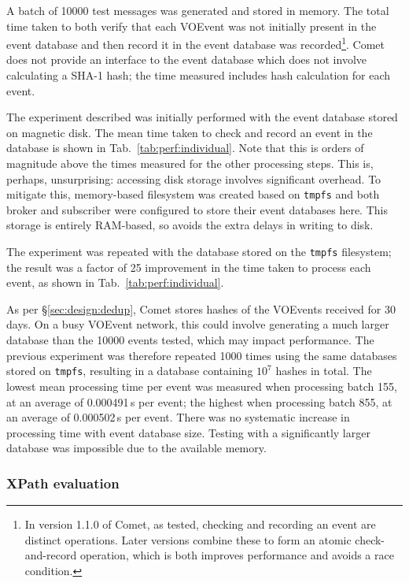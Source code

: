 \documentclass[5p,authoryear]{elsarticle}
\begin{document}
A batch of 10000 test messages was generated and stored in memory. The total
time taken to both verify that each VOEvent was not initially present in the
event database and then record it in the event database was
recorded\footnote{In version 1.1.0 of Comet, as tested, checking and recording
an event are distinct operations. Later versions combine these to form an
atomic check-and-record operation, which is both improves performance and
avoids a race condition.}. Comet does not provide an interface to the event
database which does not involve calculating a SHA-1 hash; the time measured
includes hash calculation for each event.

The experiment described was initially performed with the event database
stored on magnetic disk. The mean time taken to check and record an event in
the database is shown in Tab.~\ref{tab:perf:individual}. Note that this is
orders of magnitude above the times measured for the other processing steps.
This is, perhaps, unsurprising: accessing disk storage involves significant
overhead. To mitigate this, memory-based filesystem was created based on
\texttt{tmpfs} \citep{Kerrisk:2014} and both broker and subscriber were
configured to store their event databases here. This storage is entirely
RAM-based, so avoids the extra delays in writing to disk.

The experiment was repeated with the database stored on the \texttt{tmpfs}
filesystem; the result was a factor of 25 improvement in the time taken to
process each event, as shown in Tab.~\ref{tab:perf:individual}.

As per \S\ref{sec:design:dedup}, Comet stores hashes of the VOEvents received
for 30 days. On a busy VOEvent network, this could involve generating a much
larger database than the 10000 events tested, which may impact performance.
The previous experiment was therefore repeated 1000 times using the same
databases stored on \texttt{tmpfs}, resulting in a database containing $10^7$
hashes in total. The lowest mean processing time per event was measured when
processing batch 155, at an average of 0.000491\,s per event; the highest when
processing batch 855, at an average of 0.000502\,s per event. There was no
systematic increase in processing time with event database size. Testing with
a significantly larger database was impossible due to the available memory.

\subsubsection{XPath evaluation}
\label{sec:perf:individual:xpath}
\end{document}
